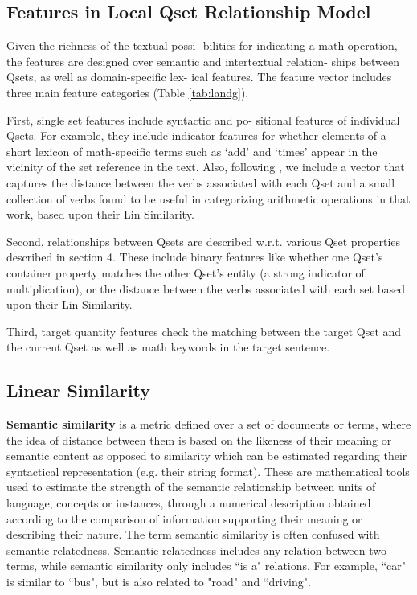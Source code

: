 \documentclass[document.tex]{subfiles}
\begin{document}
\subsection{Features in Local Qset Relationship Model}
Given the richness of the textual possi-
bilities for indicating a math operation, the features
are designed over semantic and intertextual relation-
ships between Qsets, as well as domain-specific lex-
ical features. The feature vector includes three main
feature categories (Table \ref{tab:landg}).

First, single set features include syntactic and po-
sitional features of individual Qsets. For example,
they include indicator features for whether elements
of a short lexicon of math-specific terms such as ‘add’ and ‘times’ appear in the vicinity of the set
reference in the text. Also, following \cite{1}, we include a vector that captures the distance between the verbs associated with each Qset and a small collection of verbs found to be useful
in categorizing arithmetic operations in that work,
based upon their Lin Similarity\cite{31}.

Second, relationships between Qsets are described w.r.t. various Qset properties described in section 4. These include binary features like whether one Qset’s container property matches the other Qset’s entity (a strong indicator of multiplication), or
the distance between the verbs associated with each
set based upon their Lin Similarity.

Third, target quantity features check the matching
between the target Qset and the current Qset as well
as math keywords in the target sentence.
\subsection{Linear Similarity}

\noindent \textbf{Semantic similarity} is a metric defined over a set of documents or terms, where the idea of distance between them is based on the likeness of their meaning or semantic content as opposed to similarity which can be estimated regarding their syntactical representation (e.g. their string format). These are mathematical tools used to estimate the strength of the semantic relationship between units of language, concepts or instances, through a numerical description obtained according to the comparison of information supporting their meaning or describing their nature. The term semantic similarity is often confused with semantic relatedness. Semantic relatedness includes any relation between two terms, while semantic similarity only includes ``is a" relations. For example, ``car" is similar to ``bus", but is also related to "road" and ``driving".
\end{document}
